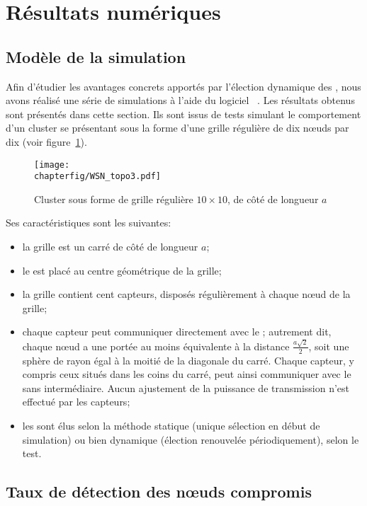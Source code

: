 \section{Résultats numériques}
\label{sa:sec:resultats}
    \subsection{Modèle de la simulation}

    Afin d'étudier les avantages concrets apportés par l'élection dynamique des \cns, nous avons réalisé une série de simulations à l'aide du logiciel \nsii~\cite{ns2}.
Les résultats obtenus sont présentés dans cette section.
Ils sont issus de tests simulant le comportement d'un cluster se présentant sous la forme d'une grille régulière de dix nœuds par dix (voir figure~\ref{sa:fig:grille}).
\begin{figure}[ht]
    \centering
    \texttt{[image: \\chapterfig/WSN\_topo3.pdf]}
    \caption{Cluster sous forme de grille régulière $10 \times 10$, de côté de longueur $a$}\label{sa:fig:grille}
\end{figure}
Ses caractéristiques sont les suivantes:
\begin{itemize}
    \item la grille est un carré de côté de longueur $a$;
    \item le \ch est placé au centre géométrique de la grille;
    \item la grille contient cent capteurs, disposés régulièrement à chaque nœud de la grille;
    \item chaque capteur peut communiquer directement avec le \ch; autrement dit, chaque nœud a une portée au moins équivalente à la distance $\frac{a \sqrt{2}}{2}$, soit une sphère de rayon égal à la moitié de la diagonale du carré. Chaque capteur, y compris ceux situés dans les coins du carré, peut ainsi communiquer avec le \ch sans intermédiaire. Aucun ajustement de la puissance de transmission n'est effectué par les capteurs;
    \item les \cns sont élus selon la méthode statique (unique sélection en début de simulation) ou bien dynamique (élection renouvelée périodiquement), selon le test.
\end{itemize}

    \subsection{Taux de détection des nœuds compromis}


